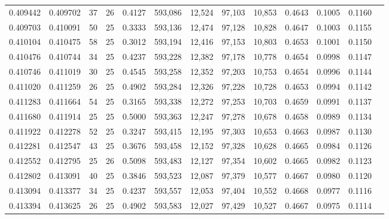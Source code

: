 \begin{tabular}{rrrrrrrrrrrrr}
0.409442 & 0.409702 &    37 &  26 &                                     0.4127 & 593,086 &  12,524 &  97,103 &  10,853 & 0.4643 & 0.1005 & 0.1160 \\
0.409703 & 0.410091 &    50 &  25 &                                     0.3333 & 593,136 &  12,474 &  97,128 &  10,828 & 0.4647 & 0.1003 & 0.1155 \\
0.410104 & 0.410475 &    58 &  25 &                                     0.3012 & 593,194 &  12,416 &  97,153 &  10,803 & 0.4653 & 0.1001 & 0.1150 \\
0.410476 & 0.410744 &    34 &  25 &                                     0.4237 & 593,228 &  12,382 &  97,178 &  10,778 & 0.4654 & 0.0998 & 0.1147 \\
0.410746 & 0.411019 &    30 &  25 &                                     0.4545 & 593,258 &  12,352 &  97,203 &  10,753 & 0.4654 & 0.0996 & 0.1144 \\
0.411020 & 0.411259 &    26 &  25 &                                     0.4902 & 593,284 &  12,326 &  97,228 &  10,728 & 0.4653 & 0.0994 & 0.1142 \\
0.411283 & 0.411664 &    54 &  25 &                                     0.3165 & 593,338 &  12,272 &  97,253 &  10,703 & 0.4659 & 0.0991 & 0.1137 \\
0.411680 & 0.411914 &    25 &  25 &                                     0.5000 & 593,363 &  12,247 &  97,278 &  10,678 & 0.4658 & 0.0989 & 0.1134 \\
0.411922 & 0.412278 &    52 &  25 &                                     0.3247 & 593,415 &  12,195 &  97,303 &  10,653 & 0.4663 & 0.0987 & 0.1130 \\
0.412281 & 0.412547 &    43 &  25 &                                     0.3676 & 593,458 &  12,152 &  97,328 &  10,628 & 0.4665 & 0.0984 & 0.1126 \\
0.412552 & 0.412795 &    25 &  26 &                                     0.5098 & 593,483 &  12,127 &  97,354 &  10,602 & 0.4665 & 0.0982 & 0.1123 \\
0.412802 & 0.413091 &    40 &  25 &                                     0.3846 & 593,523 &  12,087 &  97,379 &  10,577 & 0.4667 & 0.0980 & 0.1120 \\
0.413094 & 0.413377 &    34 &  25 &                                     0.4237 & 593,557 &  12,053 &  97,404 &  10,552 & 0.4668 & 0.0977 & 0.1116 \\
0.413394 & 0.413625 &    26 &  25 &                                     0.4902 & 593,583 &  12,027 &  97,429 &  10,527 & 0.4667 & 0.0975 & 0.1114 \\

\end{tabular}
